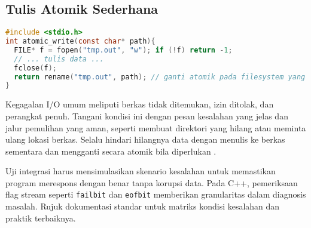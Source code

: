 \documentclass[../main.tex]{subfiles}
\begin{document}
\subsection{Tulis Atomik Sederhana}
\begin{lstlisting}[language=C, caption={Menulis ke file sementara lalu ganti (C, POSIX)}]
#include <stdio.h>
int atomic_write(const char* path){
  FILE* f = fopen("tmp.out", "w"); if (!f) return -1;
  // ... tulis data ...
  fclose(f);
  return rename("tmp.out", path); // ganti atomik pada filesystem yang mendukung
}
\end{lstlisting}
Kegagalan I/O umum meliputi berkas tidak ditemukan, izin ditolak, dan perangkat penuh. Tangani kondisi ini dengan pesan kesalahan yang jelas dan jalur pemulihan yang aman, seperti membuat direktori yang hilang atau meminta ulang lokasi berkas. Selalu hindari hilangnya data dengan menulis ke berkas sementara dan mengganti secara atomik bila diperlukan \parencite{gnu-c-manual}.

Uji integrasi harus mensimulasikan skenario kesalahan untuk memastikan program merespons dengan benar tanpa korupsi data. Pada C++, pemeriksaan flag stream seperti \texttt{failbit} dan \texttt{eofbit} memberikan granularitas dalam diagnosis masalah. Rujuk dokumentasi standar untuk matriks kondisi kesalahan dan praktik terbaiknya.
\end{document}
